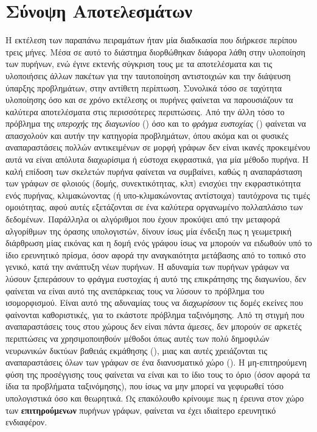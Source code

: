 \section{Σύνοψη Αποτελεσμάτων}
Η εκτέλεση των παραπάνω πειραμάτων ήταν μία διαδικασία που διήρκεσε περίπου τρεις μήνες.
Μέσα σε αυτό το διάστημα διορθώθηκαν διάφορα λάθη στην υλοποίηση των πυρήνων, ενώ έγινε εκτενής σύγκριση τους με τα αποτελέσματα και τις υλοποιήσεις άλλων πακέτων για την ταυτοποίηση αντιστοιχιών και την διάψευση ύπαρξης προβλημάτων, στην αντίθετη περίπτωση.
Συνολικά τόσο σε ταχύτητα υλοποίησης όσο και σε χρόνο εκτέλεσης οι πυρήνες  φαίνεται να παρουσιάζουν τα καλύτερα αποτελέσματα στις περισσότερες περιπτώσεις.
Από την άλλη τόσο το πρόβλημα της \textit{υπεροχής της διαγωνίου} () όσο και το \textit{φράγμα ευστοχίας} () φαίνεται να απασχολούν και αυτήν την κατηγορία προβλημάτων, όπου ακόμα και οι φυσικές αναπαραστάσεις πολλών αντικειμένων σε μορφή γράφων δεν είναι ικανές προκειμένου αυτά να είναι απόλυτα διαχωρίσιμα ή εύστοχα εκφραστικά, για μία μέθοδο πυρήνα.
Η καλή επίδοση των σκελετών πυρήνα φαίνεται να συμβαίνει, καθώς η αναπαράσταση των γράφων σε φλοιούς (δομής, συνεκτικότητας, κλπ) ενισχύει την εκφραστικότητα ενός πυρήνας, κλιμακώνοντας (ή υπο-κλιμακώνοντας αντίστοιχα) ταυτόχρονα τις τιμές ομοιότητας, αφού αυτές εξετάζονται σε ένα καλύτερα οργανωμένο πολλαπλάσιο των δεδομένων.
Παράλληλα οι αλγόριθμοι  που έχουν προκύψει από την μεταφορά αλγορίθμων της όρασης υπολογιστών, δίνουν ίσως μία ένδειξη πως η γεωμετρική διάρθρωση μίας εικόνας και η δομή ενός γράφου ίσως να μπορούν να ειδωθούν υπό το ίδιο ερευνητικό πρίσμα, όσον αφορά την αναγκαιότητα μετάβασης από το τοπικό στο γενικό, κατά την ανάπτυξη νέων πυρήνων.
Η αδυναμία των πυρήνων γράφων να λύσουν ξεπεράσουν το φράγμα ευστοχίας ή αυτό της επικράτησης της διαγωνίου, δεν φαίνεται να είναι αυτό της ανεπάρκειας τους να λύσουν το πρόβλημα του ισομορφισμού.
Είναι αυτό της αδυναμίας τους να \textit{διαχωρίσουν} τις δομές εκείνες που φαίνονται καθοριστικές, για το εκάστοτε πρόβλημα ταξινόμησης.
Από τη στιγμή που αναπαραστάσεις τους στου χώρους  δεν είναι πάντα άμεσες, δεν μπορούν σε αρκετές περιπτώσεις  να χρησιμοποιηθούν μέθοδοι όπως αυτές των πολύ δημοφιλών νευρωνικών δικτύων βαθειάς εκμάθησης (), μιας και αυτές χρειάζονται τις αναπαραστάσεις όλων των γράφων σε ένα διανυσματικό χώρο ().
Η μη-επιτηρούμενη φύση της προσέγγισης τους φαίνεται να είναι και το ίδιο τους το όριο (όσον αφορά τα ίδια τα προβλήματα ταξινόμησης), που ίσως να μην μπορεί να γεφυρωθεί τόσο υπολογιστικά όσο και θεωρητικά.
Ως επακόλουθο κρίνουμε πως η έρευνα στον χώρο των \textbf{επιτηρούμενων} πυρήνων γράφων, φαίνεται να έχει ιδιαίτερο ερευνητικό ενδιαφέρον.
